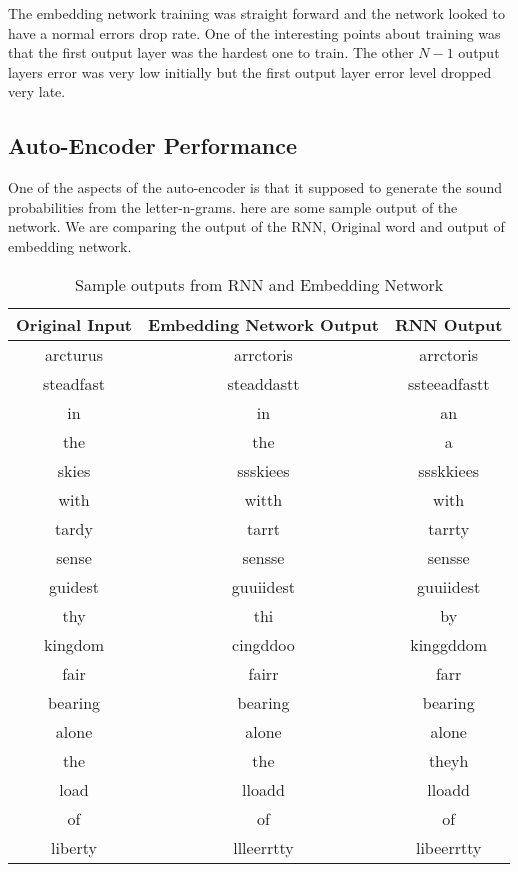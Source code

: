 The embedding network  training was straight forward and the network looked to have a  normal errors drop rate. One of the interesting points about training was that the first output layer was the hardest one to train. The other $N-1$ output layers error was very low initially but the first output layer error level dropped very late. 

\subsection{Auto-Encoder Performance}
One of the aspects of the auto-encoder is that it supposed to generate the sound probabilities from the letter-n-grams.  here are some sample output of the network. We are comparing the output of the RNN, Original word and output of embedding network. 
\begin{table}
    \centering
    \begin{tabular}{|c | c | c |}
        \hline
        Original Input &  Embedding Network Output & RNN Output \\
        \hline 
        arcturus & arrctoris & arrctoris \\ 
        steadfast & steaddastt & ssteeadfastt \\ 
        in & in & an \\ 
        the & the & a \\ 
        skies & ssskiees & ssskkiees \\ 
        with & witth & with \\ 
        tardy & tarrt & tarrty \\ 
        sense & sensse & sensse \\ 
        guidest & guuiidest & guuiidest \\ 
        thy & thi & by \\ 
        kingdom & cingddoo & kinggddom \\ 
        fair & fairr & farr \\ 
        bearing & bearing & bearing \\ 
        alone & alone & alone \\ 
        the & the & theyh \\ 
        load & lloadd & lloadd \\ 
        of & of & of \\ 
        liberty & llleerrtty & libeerrtty \\
        \hline         
    \end{tabular}

    \caption{Sample outputs from RNN and Embedding Network}
\end{table}

